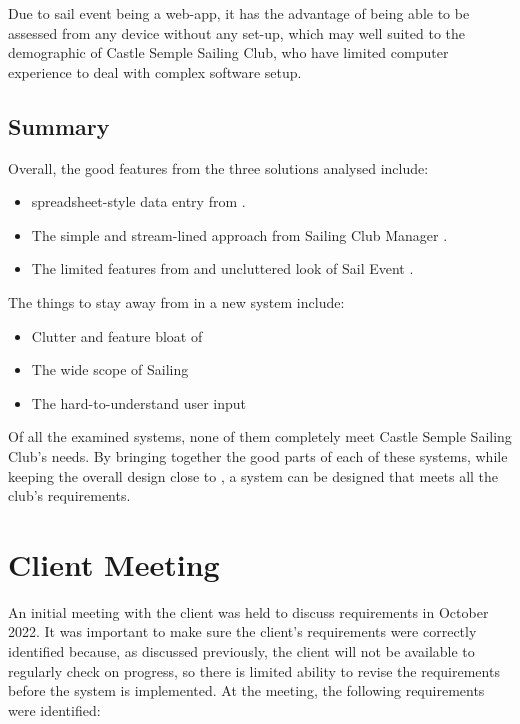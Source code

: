 \documentclass{l4proj}
\begin{document}
Due to sail event being a web-app, it has the advantage of being able to be assessed from any device without any set-up, which may well suited to the demographic of Castle Semple Sailing Club, who have limited computer experience to deal with complex software setup.

\subsection{Summary}

Overall, the good features from the three solutions analysed include:
\begin{itemize}
    \item
    spreadsheet-style data entry from \citet{sailwave}.
    \item
    The simple and stream-lined approach from Sailing Club Manager \citet{ClubManager}.
    \item
    The limited features from and uncluttered look of Sail Event \citet{SailEvent}.
\end{itemize}

The things to stay away from in a new system include:
\begin{itemize}
    \item
    Clutter and feature bloat of \citet{sailwave} 
    \item
    The wide scope of Sailing \citet{ClubManager}
    \item
    The hard-to-understand user input \citet{SailEvent}
\end{itemize}

Of all the examined systems, none of them completely meet Castle Semple Sailing Club's needs. By bringing together the good parts of each of these systems, while keeping the overall design close to \citet{sailwave}, a system can be designed that meets all the club's requirements.

\section{Client Meeting}

An initial meeting with the client was held to discuss requirements in October 2022. It was important to make sure the client’s requirements were correctly identified because, as discussed previously, the client will not be available to regularly check on progress, so there is limited ability to revise the requirements before the system is implemented.  At the meeting, the following requirements were identified:
\end{document}
